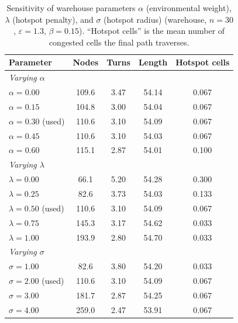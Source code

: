 \begin{table}[htbp]\centering
\caption{Sensitivity of warehouse parameters $\alpha$ (environmental weight), $\lambda$ (hotspot penalty), and $\sigma$ (hotspot radius) (warehouse, $n=30$, $\varepsilon=1.3$, $\beta=0.15$). ``Hotspot cells'' is the mean number of congested cells the final path traverses.}
\label{tab:sens_warehouse}
\begin{tabular}{lcccc}\toprule
Parameter & Nodes & Turns & Length & Hotspot cells \\\midrule
\multicolumn{5}{l}{\emph{Varying $\alpha$}} \\
$\alpha=0.00$ & 109.6 & 3.47 & 54.14 & 0.067 \\
$\alpha=0.15$ & 104.8 & 3.00 & 54.04 & 0.067 \\
$\alpha=0.30$ (used) & 110.6 & 3.10 & 54.09 & 0.067 \\
$\alpha=0.45$ & 110.6 & 3.10 & 54.03 & 0.067 \\
$\alpha=0.60$ & 115.1 & 2.87 & 54.01 & 0.100 \\
\midrule
\multicolumn{5}{l}{\emph{Varying $\lambda$}} \\
$\lambda=0.00$ & 66.1 & 5.20 & 54.28 & 0.300 \\
$\lambda=0.25$ & 82.6 & 3.73 & 54.03 & 0.133 \\
$\lambda=0.50$ (used) & 110.6 & 3.10 & 54.09 & 0.067 \\
$\lambda=0.75$ & 145.3 & 3.17 & 54.62 & 0.033 \\
$\lambda=1.00$ & 193.9 & 2.80 & 54.70 & 0.033 \\
\midrule
\multicolumn{5}{l}{\emph{Varying $\sigma$}} \\
$\sigma=1.00$ & 82.6 & 3.80 & 54.20 & 0.033 \\
$\sigma=2.00$ (used) & 110.6 & 3.10 & 54.09 & 0.067 \\
$\sigma=3.00$ & 181.7 & 2.87 & 54.25 & 0.067 \\
$\sigma=4.00$ & 259.0 & 2.47 & 53.91 & 0.067 \\
\bottomrule
\end{tabular}\end{table}